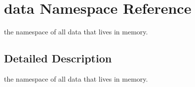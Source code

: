 \hypertarget{namespacedata}{
\section{data \-Namespace \-Reference}
\label{namespacedata}
}


the namespace of all data that lives in memory.  




\subsection{\-Detailed \-Description}
the namespace of all data that lives in memory. 